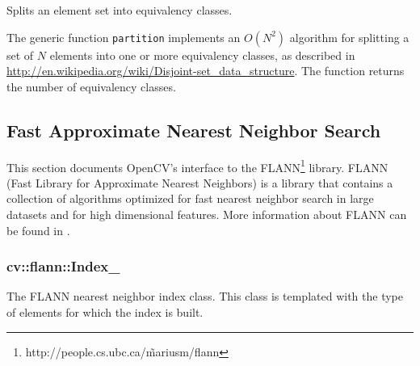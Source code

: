 Splits an element set into equivalency classes.

\begin{description}
\end{description}

The generic function \texttt{partition} implements an $O(N^2)$ algorithm for
splitting a set of $N$ elements into one or more equivalency classes, as described in \url{http://en.wikipedia.org/wiki/Disjoint-set_data_structure}. The function
returns the number of equivalency classes.

\subsection{Fast Approximate Nearest Neighbor Search}

This section documents OpenCV's interface to the FLANN\footnote{http://people.cs.ubc.ca/\~mariusm/flann} library. FLANN (Fast Library for Approximate Nearest Neighbors) is a library that
contains a collection of algorithms optimized for fast nearest neighbor search in large datasets and for high dimensional features. More 
information about FLANN can be found in \cite{muja_flann_2009}.

\ifplastex
{}
\else
\subsubsection{cv::flann::Index\_}\label{cvflann.Index}
\fi
The FLANN nearest neighbor index class. This class is templated with the type of elements for which the index is built.

